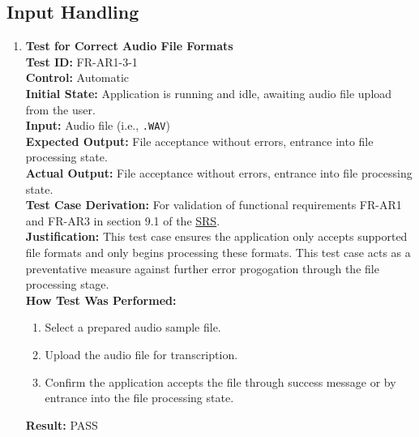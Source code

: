 \documentclass[12pt, titlepage]{article}
\begin{document}
  \subsection{Input Handling}
  \begin{enumerate}
    \item \textbf{Test for Correct Audio File Formats} \\
      \newline
      \textbf{Test ID:} FR-AR1-3-1 \\
      \textbf{Control:} Automatic \\
      \textbf{Initial State:} Application is running and idle, awaiting audio file upload from the user. \\
      \textbf{Input:} Audio file (i.e., \texttt{.WAV}) \\
      \textbf{Expected Output:} File acceptance without errors, entrance into file processing state. \\
      \textbf{Actual Output:} File acceptance without errors, entrance into file processing state. \\
      \textbf{Test Case Derivation:} For validation of functional requirements FR-AR1 and FR-AR3 in section 9.1 of the 
      \href{https://github.com/emilyperica/ScoreGen/blob/main/docs/SRS-Volere/SRS.pdf}{SRS}. \\
      \textbf{Justification:} This test case ensures the application only accepts supported file formats and only begins processing 
      these formats. This test case acts as a preventative measure against further error progogation through the file processing stage.\\
      \textbf{How Test Was Performed:}
      \begin{enumerate}
          \item Select a prepared audio sample file.
          \item Upload the audio file for transcription.
          \item Confirm the application accepts the file through success message or by entrance into the file processing state.
      \end{enumerate}
      \textbf{Result:} PASS
  

\end{enumerate}
\end{document}
